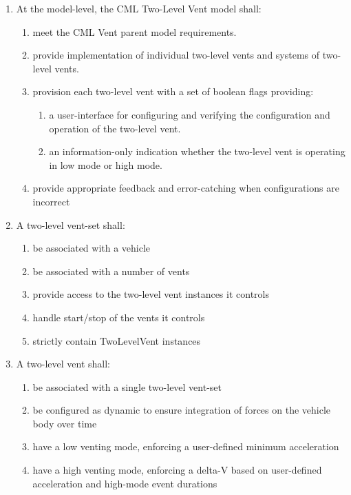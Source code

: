 \documentclass[11pt,fleqn]{report}
\begin{document}
\begin{enumerate}[noitemsep]
    \item At the model-level, the CML Two-Level Vent model shall:
    \begin{enumerate}
        \item meet the CML Vent parent model requirements.
        \item provide implementation of individual two-level vents and systems of two-level vents.
        \item provision each two-level vent with a set of boolean flags providing:
        \begin{enumerate}
            \item a user-interface for configuring and verifying the configuration and operation of the two-level vent.
            \item an information-only indication whether the two-level vent is operating in low mode or high mode.
        \end{enumerate}
        \item provide appropriate feedback and error-catching when configurations are incorrect
    \end{enumerate}
    \item A two-level vent-set shall:
    \begin{enumerate}
        \item be associated with a vehicle
        \item be associated with a number of vents
        \item provide access to the two-level vent instances it controls
        \item handle start/stop of the vents it controls
        \item strictly contain TwoLevelVent instances
    \end{enumerate}
        \item A two-level vent shall:
        \begin{enumerate}
            \item be associated with a single two-level vent-set
            \item be configured as dynamic to ensure integration of forces on the vehicle body over time
            \item have a low venting mode, enforcing a user-defined minimum acceleration
            \item have a high venting mode, enforcing a delta-V based on user-defined acceleration and high-mode event durations

\end{enumerate}
\end{enumerate}
\end{document}
